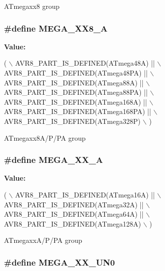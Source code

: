 A\-Tmegaxx8 group \hypertarget{group__mega__part__macros__group_gadb4a50447f658e564b640ca248e85b51}{
\subsubsection[{M\-E\-G\-A\-\_\-\-X\-X8\-\_\-\-A}]{\setlength{\rightskip}{0pt plus 5cm}\#define M\-E\-G\-A\-\_\-\-X\-X8\-\_\-\-A}}\label{group__mega__part__macros__group_gadb4a50447f658e564b640ca248e85b51}
{\bfseries Value\-:}
\begin{DoxyCode}
( \(\backslash\)
                AVR8\_PART\_IS\_DEFINED(ATmega48A)   || \(\backslash\)
                AVR8\_PART\_IS\_DEFINED(ATmega48PA)  || \(\backslash\)
                AVR8\_PART\_IS\_DEFINED(ATmega88A)   || \(\backslash\)
                AVR8\_PART\_IS\_DEFINED(ATmega88PA)  || \(\backslash\)
                AVR8\_PART\_IS\_DEFINED(ATmega168A)  || \(\backslash\)
                AVR8\_PART\_IS\_DEFINED(ATmega168PA) || \(\backslash\)
                AVR8\_PART\_IS\_DEFINED(ATmega328P) \(\backslash\)
                )
\end{DoxyCode}
A\-Tmegaxx8\-A/\-P/\-P\-A group \hypertarget{group__mega__part__macros__group_ga2b23bf35c1439ec05ddac769a8d8d1f8}{
\subsubsection[{M\-E\-G\-A\-\_\-\-X\-X\-\_\-\-A}]{\setlength{\rightskip}{0pt plus 5cm}\#define M\-E\-G\-A\-\_\-\-X\-X\-\_\-\-A}}\label{group__mega__part__macros__group_ga2b23bf35c1439ec05ddac769a8d8d1f8}
{\bfseries Value\-:}
\begin{DoxyCode}
( \(\backslash\)
                AVR8\_PART\_IS\_DEFINED(ATmega16A)  || \(\backslash\)
                AVR8\_PART\_IS\_DEFINED(ATmega32A)  || \(\backslash\)
                AVR8\_PART\_IS\_DEFINED(ATmega64A)  || \(\backslash\)
                AVR8\_PART\_IS\_DEFINED(ATmega128A) \(\backslash\)
                )
\end{DoxyCode}
A\-Tmegaxx\-A/\-P/\-P\-A group \hypertarget{group__mega__part__macros__group_gae1703e1537f2cbb10b4a8992c8b7b70b}{
\subsubsection[{M\-E\-G\-A\-\_\-\-X\-X\-\_\-\-U\-N0}]{\setlength{\rightskip}{0pt plus 5cm}\#define M\-E\-G\-A\-\_\-\-X\-X\-\_\-\-U\-N0}}\label{group__mega__part__macros__group_gae1703e1537f2cbb10b4a8992c8b7b70b}

